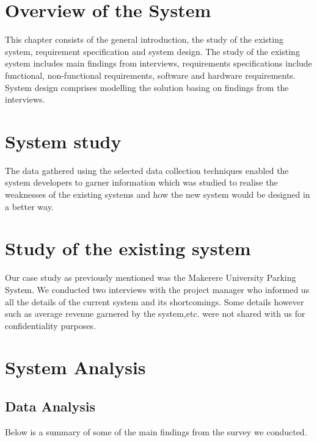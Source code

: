 \section{Overview of the System}
This chapter consists of the general introduction, the study of the existing system, requirement specification and system design. The study of the existing system includes main findings from interviews, requirements specifications include functional, non-functional requirements, software and hardware requirements. System design comprises modelling the solution basing on findings from the interviews.


\section{System study}
The data gathered using the selected data collection techniques enabled the system developers to garner information which was studied to realise the weaknesses of the existing systems and how the new system would be designed in a better way.


\section{Study of the existing system}
Our case study as previously mentioned was the Makerere University Parking System. We conducted two interviews with the project manager who informed us all the details of the current system and its shortcomings. Some details however such as average revenue garnered by the system,etc. were not shared with us for confidentiality purposes.


\section{System Analysis}

\subsection{Data Analysis}
Below is a summary of some of the main findings from the survey we conducted.

